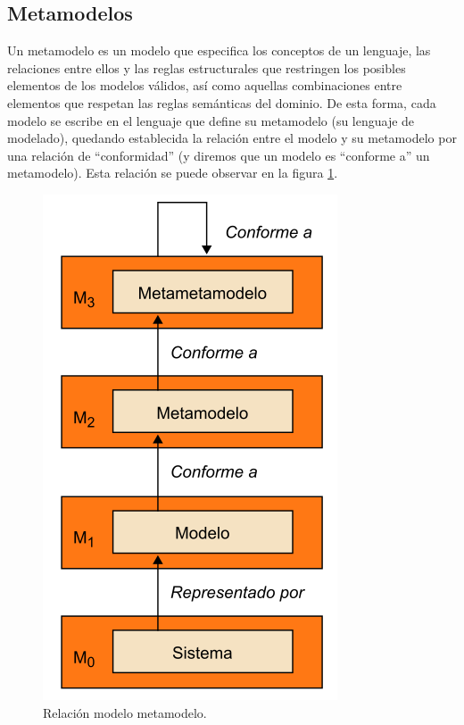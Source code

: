 \subsection{Metamodelos}
\label{Metamodelos}

Un metamodelo es un modelo que especifica los conceptos de un lenguaje, las relaciones entre ellos y las reglas estructurales que restringen los posibles elementos de los modelos válidos, así como aquellas combinaciones entre elementos que respetan las reglas semánticas del dominio.
De esta forma, cada modelo se escribe en el lenguaje que define su metamodelo (su lenguaje de modelado), quedando establecida la relación entre el modelo y su metamodelo por una relación de “conformidad” (y diremos que un modelo es “conforme a” un metamodelo). Esta relación se puede observar en la figura \ref{fig:Relación modelo metamodelo}.

\begin{figure}[!h] 
	\begin{center}
		\includegraphics [scale=0.40]{imagenes/Relacion_modelo_metamodelo.png}
	\end{center}
	\caption{Relación modelo metamodelo.}
	\label{fig:Relación modelo metamodelo}
\end{figure} 

